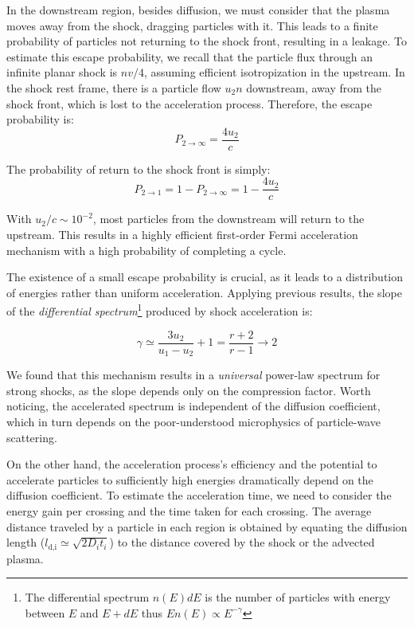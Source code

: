 In the downstream region, besides diffusion, we must consider that the plasma moves away from the shock, dragging particles with it. This leads to a finite probability of particles not returning to the shock front, resulting in a leakage. To estimate this escape probability, we recall that the particle flux through an infinite planar shock is \( n v / 4 \), assuming efficient isotropization in the upstream. In the shock rest frame, there is a particle flow \( u_2 n \) downstream, away from the shock front, which is lost to the acceleration process. Therefore, the escape probability is:
%
\begin{equation}
P_{2 \rightarrow \infty} = \frac{4 u_2}{c}
\end{equation}

The probability of return to the shock front is simply:
%
\begin{equation}
P_{2 \rightarrow 1} = 1 - P_{2 \rightarrow \infty} = 1 - \frac{4 u_2}{c}
\end{equation}

With \( u_2/c \sim 10^{-2} \), most particles from the downstream will return to the upstream. This results in a highly efficient first-order Fermi acceleration mechanism with a high probability of completing a cycle.

The existence of a small escape probability is crucial, as it leads to a distribution of energies rather than uniform acceleration. Applying previous results, the slope of the \emph{differential spectrum}\footnote{The differential spectrum \( n(E)dE \) is  the number of particles with energy between \( E \) and \( E + dE \) thus \( E n(E) \propto E^{-\gamma} \)} produced by shock acceleration is:
%
\begin{remark}
\begin{equation}
\gamma \simeq \frac{3 u_2}{u_1 - u_2} + 1 = \frac{r + 2}{r - 1} \rightarrow 2
\end{equation}
\end{remark}

We found that this mechanism results in a \emph{universal} power-law spectrum for strong shocks, as the slope depends only on the compression factor. Worth noticing, the accelerated spectrum is independent of the diffusion coefficient, which in turn depends on the poor-understood microphysics of particle-wave scattering.

On the other hand, the acceleration process's efficiency and the potential to accelerate particles to sufficiently high energies dramatically depend on the diffusion coefficient. 
%
To estimate the acceleration time, we need to consider the energy gain per crossing and the time taken for each crossing. %
The average distance traveled by a particle in each region is obtained by equating the diffusion length (\( l_{\text{d,i}} \simeq \sqrt{2 D_i t_i} \)) to the distance covered by the shock or the advected plasma.

